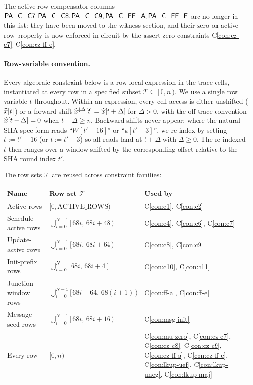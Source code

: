 The active-row compensator columns
$\mathsf{PA\_C\_C7}, \mathsf{PA\_C\_C8}, \mathsf{PA\_C\_C9}, \mathsf{PA\_C\_FF\_A}, \mathsf{PA\_C\_FF\_E}$
are no longer in this list: they have been moved to the witness
section, and their zero-on-active-row property is now enforced
in-circuit by the assert-zero constraints
C\ref{con:cz-c7}--C\ref{con:cz-ff-e}.

\paragraph{Row-variable convention.}\label{sec:row-conv}

Every algebraic constraint below is a row-local expression in the
trace cells, instantiated at every row in a specified subset
$\mathcal{T} \subseteq [\,0, n\,)$. We use a single row variable
$t$ throughout. Within an expression, every cell access is either
unshifted ($\widehat{x}[t]$) or a forward shift
$\widehat{x}^{\downarrow\Delta}[t] = \widehat{x}[t+\Delta]$
for $\Delta > 0$, with the off-trace convention
$\widehat{x}[t+\Delta] = 0$ when $t + \Delta \ge n$. Backward
shifts never appear: where the natural SHA-spec form reads
``$W[t'-16]$'' or ``$a[t'-3]$'', we re-index by setting $t := t'-16$
(or $t := t'-3$) so all reads land at $t + \Delta$ with
$\Delta \ge 0$. The re-indexed $t$ then ranges over a window
shifted by the corresponding offset relative to the SHA round
index $t'$.

\smallskip

The row sets $\mathcal{T}$ are reused across constraint families:
\begin{center}
\small
\begin{tabular}{lll}
\toprule
\textbf{Name} & \textbf{Row set $\mathcal{T}$} & \textbf{Used by} \\
\midrule
Active rows           & $[0, \mathrm{ACTIVE\_ROWS})$ & C\ref{con:c1}, C\ref{con:c2} \\
Schedule-active rows  & $\bigcup_{i=0}^{N-1} [\,68i,\,68i + 48\,)$ & C\ref{con:c4}, C\ref{con:c6}, C\ref{con:c7} \\
Update-active rows    & $\bigcup_{i=0}^{N-1} [\,68i,\,68i + 64\,)$ & C\ref{con:c8}, C\ref{con:c9} \\
Init-prefix rows      & $\bigcup_{i=0}^{N}   [\,68i,\,68i + 4\,)$  & C\ref{con:c10}, C\ref{con:c11} \\
Junction-window rows  & $\bigcup_{i=0}^{N-1} [\,68i + 64,\,68(i{+}1)\,)$ & C\ref{con:ff-a}, C\ref{con:ff-e} \\
Message-seed rows     & $\bigcup_{i=0}^{N-1} [\,68i,\,68i + 16\,)$ & C\ref{con:msg-init} \\
Every row             & $[0, n)$                                  & C\ref{con:mu-zero}, C\ref{con:cz-c7}, C\ref{con:cz-c8}, C\ref{con:cz-c9}, C\ref{con:cz-ff-a}, C\ref{con:cz-ff-e}, C\ref{con:lkup-uef}, C\ref{con:lkup-uneg}, C\ref{con:lkup-maj} \\
\bottomrule
\end{tabular}
\end{center}

